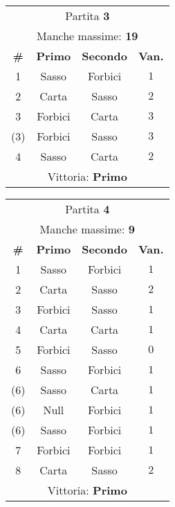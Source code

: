 \documentclass[a4paper]{article}
\begin{document}
\begin{figure}[H]
	\begin{minipage}{\linewidth}
  \centering
		\begin{minipage}{0.45\linewidth}
  \centering
        \begin{tabular}{|c|c|c|c|}
          \hline
          \multicolumn{4}{|c|}{Partita \textbf{3}} \\
          \multicolumn{4}{|c|}{\footnotesize Manche massime: \textbf{19}} \\
          \hline
          \footnotesize \textbf{\#} & \footnotesize \textbf{Primo} & \footnotesize \textbf{Secondo} & \footnotesize \textbf{Van.} \\
          \hline
          1 & Sasso & Forbici & \( 1 \)  \\
          2 & Carta & Sasso & \( 2 \)  \\
          3 & Forbici & Carta & \( 3 \)  \\
          (3) & Forbici & Sasso & \( 3 \)  \\
          4 & Sasso & Carta & \( 2 \)  \\
          \hline
          \multicolumn{4}{|c|}{\footnotesize Vittoria: \textbf{Primo}} \\
          \hline
        \end{tabular}
		\end{minipage}
		\hspace{0.05\linewidth}
		\begin{minipage}{0.45\linewidth}
  \centering
        \begin{tabular}{|c|c|c|c|}
          \hline
          \multicolumn{4}{|c|}{Partita \textbf{4}} \\
          \multicolumn{4}{|c|}{\footnotesize Manche massime: \textbf{9}} \\
          \hline
          \footnotesize \textbf{\#} & \footnotesize \textbf{Primo} & \footnotesize \textbf{Secondo} & \footnotesize \textbf{Van.} \\
          \hline
          1 & Sasso & Forbici & \( 1 \)  \\
          2 & Carta & Sasso & \( 2 \)  \\
          3 & Forbici & Sasso & \( 1 \)  \\
          4 & Carta & Carta & \( 1 \)  \\
          5 & Forbici & Sasso & \( 0 \)  \\
          6 & Sasso & Forbici & \( 1 \)  \\
          (6) & Sasso & Carta & \( 1 \)  \\
          (6) & Null & Forbici & \( 1 \)  \\
          (6) & Sasso & Forbici & \( 1 \)  \\
          7 & Forbici & Forbici & \( 1 \)  \\
          8 & Carta & Sasso & \( 2 \)  \\
          \hline
          \multicolumn{4}{|c|}{\footnotesize Vittoria: \textbf{Primo}} \\
          \hline
        \end{tabular}
		\end{minipage}
	\end{minipage}
\end{figure}
\end{document}
